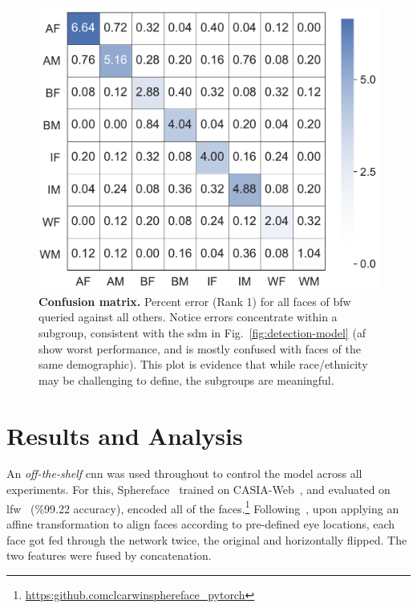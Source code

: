 \begin{figure}[t!]
	\centering    
	\includegraphics[width=\linewidth]{figures/confusion.pdf}
		\caption{\small{\textbf{Confusion matrix.} Percent error (Rank 1) for all faces of \gls{bfw} queried against all others. Notice errors concentrate within a subgroup, consistent with the \gls{sdm} in Fig.~\ref{fig:detection-model} (\ie \gls{af} show worst performance, and is mostly confused with faces of the same demographic). This plot is evidence that while race/ethnicity may be challenging to define, the subgroups are meaningful.}}
		\label{fig:confusion} 
		\vspace{-5mm}
\end{figure} 

\section{Results and Analysis}
An {\em off-the-shelf} \gls{cnn} was used throughout to control the model across all experiments. For this, Sphereface~\cite{liu2017sphereface} trained on CASIA-Web~\cite{yi2014learning}, and evaluated on \gls{lfw}~\cite{LFWTech} (\%99.22 accuracy), encoded all of the faces.\footnote{\href{$https://github.com/clcarwin/sphereface\_pytorch$}{https:\/\/github.com\/clcarwin\/sphereface\_pytorch}} Following~\cite{liu2017sphereface}, upon applying an affine transformation to align faces according to pre-defined eye locations, each face got fed through the network twice, the original and horizontally flipped. The two features were fused by concatenation.

